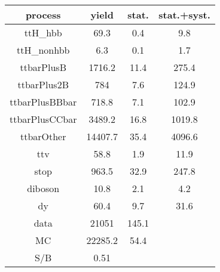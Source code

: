 \begin{tabular}{cccc}
\hline
    process     &  yield  &  stat.  &  stat.+syst.  \\
\hline
    ttH\_hbb     &  69.3   &   0.4   &      9.8      \\
   ttH\_nonhbb   &   6.3   &   0.1   &      1.7      \\
   ttbarPlusB   & 1716.2  &  11.4   &     275.4     \\
  ttbarPlus2B   &   784   &   7.6   &     124.9     \\
 ttbarPlusBBbar &  718.8  &   7.1   &     102.9     \\
 ttbarPlusCCbar & 3489.2  &  16.8   &    1019.8     \\
   ttbarOther   & 14407.7 &  35.4   &    4096.6     \\
      ttv       &  58.8   &   1.9   &     11.9      \\
      stop      &  963.5  &  32.9   &     247.8     \\
    diboson     &  10.8   &   2.1   &      4.2      \\
       dy       &  60.4   &   9.7   &     31.6      \\
      data      &  21051  &  145.1  &               \\
       MC       & 22285.2 &  54.4   &               \\
      S/B       &  0.51   &         &               \\
\hline
\end{tabular}